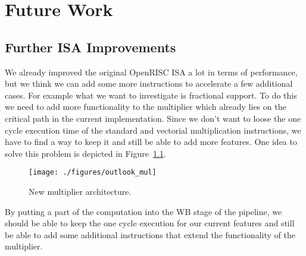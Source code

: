 
\chapter{Future Work}

\label{chapter:outlook}


\section{Further ISA Improvements}

We already improved the original OpenRISC \gls{ISA} a lot in terms of
performance, but we think we can add some more instructions to accelerate a few
additional cases.  For example what we want to investigate is fractional
support. To do this we need to add more functionality to the multiplier which
already lies on the critical path in the current implementation. Since we don't
want to loose the one cycle execution time of the standard and vectorial
multiplication instructions, we have to find a way to keep it and still be able
to add more features. One idea to solve this problem is depicted in
Figure~\ref{fig:outlook_mul}.

\begin{figure}[htbp]
  \centering\texttt{[image: ./figures/outlook\_mul]}
  \caption{New multiplier architecture.}
  \label{fig:outlook_mul}
\end{figure}

By putting a part of the computation into the \gls{WB} stage of the pipeline, we
should be able to keep the one cycle execution for our current features and
still be able to add some additional instructions that extend the functionality
of the multiplier.


